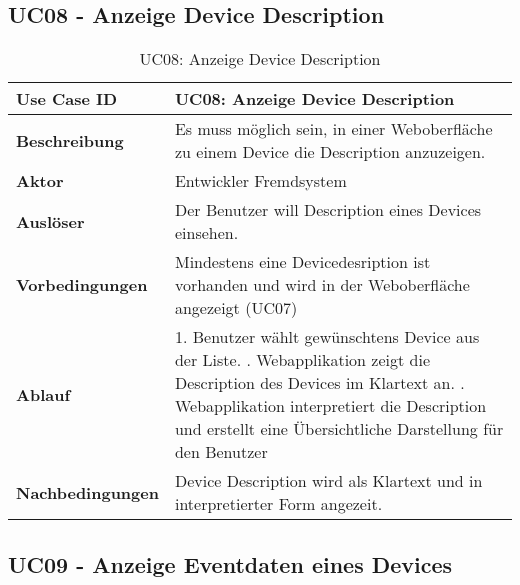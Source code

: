 \subsection{UC08 - Anzeige Device Description}
\begin{table}[H]
\begin{tabularx}{\textwidth}{|l|X|}

 \hline
 {\bf Use Case ID }    & UC08: Anzeige Device Description \\  \hline
 {\bf Beschreibung }   & Es muss möglich sein, in einer Weboberfläche zu einem Device die Description anzuzeigen. \\ \hline
 {\bf Aktor }          & Entwickler Fremdsystem \\ \hline
 {\bf Auslöser }       & Der Benutzer will Description eines Devices einsehen. \\ \hline
 {\bf Vorbedingungen } & Mindestens eine Devicedesription ist vorhanden und wird in der Weboberfläche angezeigt (UC07) \\ \hline
 {\bf Ablauf }         & 
     1. Benutzer wählt gewünschtens Device aus der Liste. \newline
     2. Webapplikation zeigt die Description des Devices im Klartext an. \newline
     3. Webapplikation interpretiert die Description und erstellt eine Übersichtliche Darstellung für den Benutzer \\ \hline
 {\bf Nachbedingungen} & Device Description wird als Klartext und in interpretierter Form angezeit.\\ \hline
  
\end{tabularx}
\caption{UC08: Anzeige Device Description}
\end{table}

\subsection{UC09 - Anzeige Eventdaten eines Devices}

